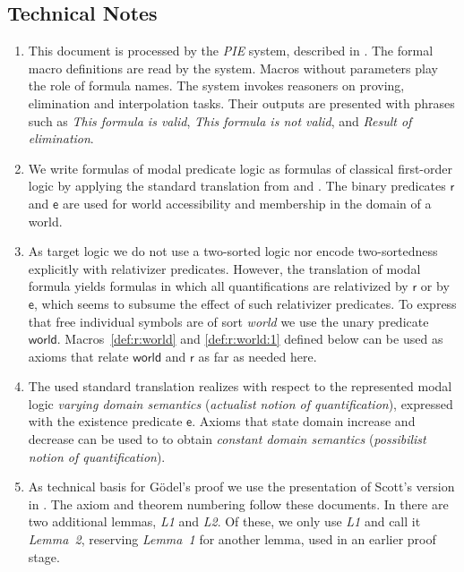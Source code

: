 \documentclass[a4paper]{article}
\newcommand{\f}[1]{\mathsf{#1}}
\newcounter{def}
\newcommand{\name}[1]{\textit{#1}}
\begin{document}
  \subsection{Technical Notes}

  \begin{enumerate}

  \item This document is processed by the \name{PIE} system, described in
  \cite{cw:2016:pie}. The formal macro definitions are read by the system.
  Macros without parameters play the role of formula names.  The system
  invokes reasoners on proving, elimination and interpolation tasks.  Their
  outputs are presented with phrases such as \name{This formula is valid},
  \name{This formula is not valid}, and \name{Result of elimination}.
  
  \item We write formulas of modal predicate logic as formulas of classical
  first-order logic by applying the standard translation from
  \cite[Sec.~11.4]{benthem:open} and \cite[Chap.~XII]{benthem:mlcl}.  The
  binary predicates $\f{r}$ and $\f{e}$ are used for world accessibility and
  membership in the domain of a world.
  
  \item As target logic we do not use a two-sorted logic nor encode
  two-sortedness explicitly with relativizer predicates. However, the
  translation of modal formula yields formulas in which all quantifications
  are relativized by $\f{r}$ or by $\f{e}$, which seems to subsume the effect
  of such relativizer predicates.  To express that free individual symbols are
  of sort \name{world} we use the unary predicate
  $\f{world}$. Macros~\ref{def:r:world} and \ref{def:r:world:1} defined below
  can be used as axioms that relate $\f{world}$ and $\f{r}$ as far as needed
  here.

  \item The used standard translation realizes with respect to the represented
  modal logic \name{varying domain semantics} (\name{actualist notion of
  quantification}), expressed with the existence predicate $\f{e}$. Axioms
  that state domain increase and decrease can be used to to obtain
  \name{constant domain semantics} (\name{possibilist notion of
  quantification}).

  \item As technical basis for Gödel's proof we use the presentation of
  Scott's version \cite[Chapter~IV, Appendix B]{sobel:theism} in
  \cite[Fig.~1]{benzmueller:etal:2017:assisted}. The axiom and theorem
  numbering follow these documents.  In
  \cite[Fig.~1]{benzmueller:etal:2017:assisted} there are two additional
  lemmas, \name{L1} and \name{L2}. Of these, we only use \name{L1} and call it
  \name{Lemma~2}, reserving \name{Lemma~1} for another lemma, used in an
  earlier proof stage.


\end{enumerate}
\end{document}
